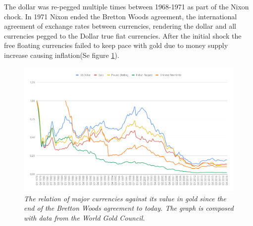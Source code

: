 The dollar was re-pegged multiple times between 1968-1971 as part of the Nixon chock\cite{bordo:bretton:woods}. In 1971 Nixon ended the Bretton Woods agreement\cite{bordo:bretton:woods}, the international agreement of exchange rates between currencies, rendering the dollar and all currencies pegged to the Dollar true fiat currencies. After the initial shock the free floating currencies failed to keep pace with gold due to money supply increase causing inflation(Se figure \ref{fig:gold:price:major:currency}).

\begin{figure}[!htb]
	\centering
	\includegraphics[width=16cm]{gold-price.png}
	\caption{\textit{The relation of major currencies against its value in gold since the end of the Bretton Woods agreement to
			today. The graph is composed with data from the World Gold Council\cite{world:gold:council}. 
	}}
	\label{fig:gold:price:major:currency}
\end{figure}


\twocolumn

